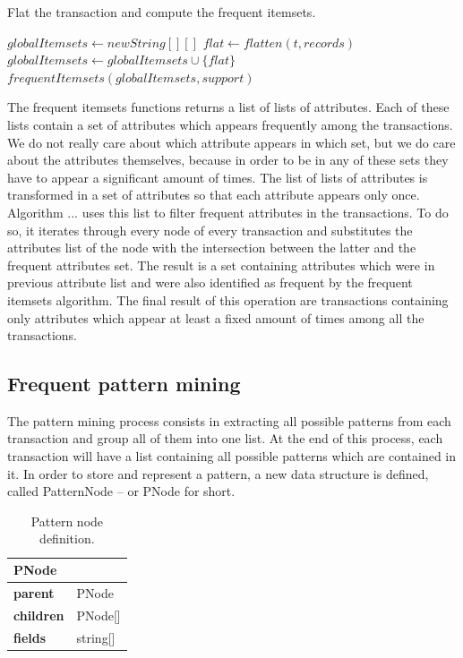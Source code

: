 \documentclass{acm_proc_article-sp-sigmod09}
\begin{document}
\begin{algorithm}
\caption{Flat the transaction and compute the frequent itemsets.}
\label{freqitemset}
\begin{algorithmic}[1]
\State $globalItemsets \gets new String[][]$
	\State $flat \gets flatten(t, records)$
	\State $globalItemsets \gets globalItemsets \cup \{flat\}$
\EndFor
\Return $frequentItemsets(globalItemsets, support)$
\EndFunction
\end{algorithmic}
\end{algorithm}

The frequent itemsets functions returns a list of lists of attributes. Each of these lists contain a set of attributes which appears frequently among the transactions. We do not really care about which attribute appears in which set, but we do care about the attributes themselves, because in order to be in any of these sets they have to appear a significant amount of times. The list of lists of attributes is transformed in a set of attributes so that each attribute appears only once. Algorithm ... uses this list to filter frequent attributes in the transactions. To do so, it iterates through every node of every transaction and substitutes the attributes list of the node with the intersection between the latter and the frequent attributes set. The result is a set containing attributes which were in previous attribute list and were also identified as frequent by the frequent itemsets algorithm. The final result of this operation are transactions containing only attributes which appear at least a fixed amount of times among all the transactions.

\subsection{Frequent pattern mining}
\label{sec:patternmining}

The pattern mining process consists in extracting all possible patterns from each transaction and group all of them into one list. At the end of this process, each transaction will have a list containing all possible patterns which are contained in it. In order to store and represent a pattern, a new data structure is defined, called PatternNode -- or PNode for short.

\begin{table}[H]
\centering
\begin{tabular}{|ll|} \hline
\textbf{PNode} & \\ \hline
\textbf{parent} & PNode \\ \hline
\textbf{children} & PNode[] \\ \hline
\textbf{fields} & string[] \\
\hline\end{tabular}
\caption{Pattern node definition.}
\label{tab:tree}
\end{table}
\end{document}
